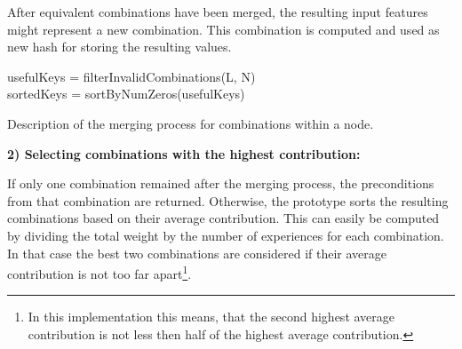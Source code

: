 After equivalent combinations have been merged, the resulting input features might represent a new combination. This combination is computed and used as new hash for storing the resulting values. 

\begin{algorithm}
	
	\BlankLine
	usefulKeys = filterInvalidCombinations(L, N) \\
	sortedKeys = sortByNumZeros(usefulKeys) \\
	\caption{Description of the merging process for combinations within a node.}
	\label{alg:combinationMerging}
\end{algorithm}

\textbf{2) Selecting combinations with the highest contribution:}

If only one combination remained after the merging process, the preconditions from that combination are returned. 
Otherwise, the prototype sorts the resulting combinations based on their average contribution. This can easily be computed by dividing the total weight by the number of experiences for each combination.
In that case the best two combinations are considered if their average contribution is not too far apart\footnote{In this implementation this means, that the second highest average contribution is not less then half of the highest average contribution.}.

